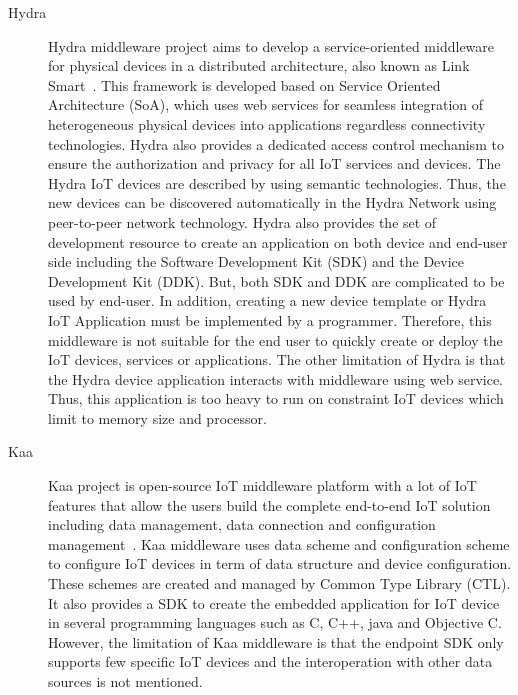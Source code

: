 \begin{description}
    \item [Hydra] Hydra middleware project aims to develop a service-oriented middleware for physical devices in a distributed architecture, also known as Link Smart~\cite{eisenhauer2009development}. This framework is developed based on Service Oriented Architecture (SoA), which uses web services for seamless integration of heterogeneous physical devices into applications regardless connectivity technologies. Hydra also provides a dedicated access control mechanism to ensure the authorization and privacy for all IoT services and devices. The Hydra IoT devices are described by using semantic technologies. Thus, the new devices can be discovered automatically in the Hydra Network using peer-to-peer network technology. Hydra also provides the set of development resource to create an application on both device and end-user side including the Software Development Kit (SDK) and the Device Development Kit (DDK). But, both SDK and DDK are complicated to be used by end-user. In addition, creating a new device template or Hydra IoT Application must be implemented by a programmer. Therefore, this middleware is not suitable for the end user to quickly create or deploy the IoT devices, services or applications. The other limitation of Hydra is that the Hydra device application interacts with middleware using web service. Thus, this application is too heavy to run on constraint IoT devices which limit to memory size and processor.
    
    \item [Kaa] Kaa project is open-source IoT middleware platform with a lot of IoT features that allow the users build the complete end-to-end IoT solution including data management, data connection and configuration management~\cite{kaa_project}. Kaa middleware uses data scheme and configuration scheme to configure IoT devices in term of data structure and device configuration. These schemes are created and managed by Common Type Library (CTL). It also provides a SDK to create the embedded application for IoT device in several programming languages such as C, C++, java and Objective C. However, the limitation of Kaa middleware is that the endpoint SDK only supports few specific IoT devices and the interoperation with other data sources is not mentioned.
    

\end{description}
